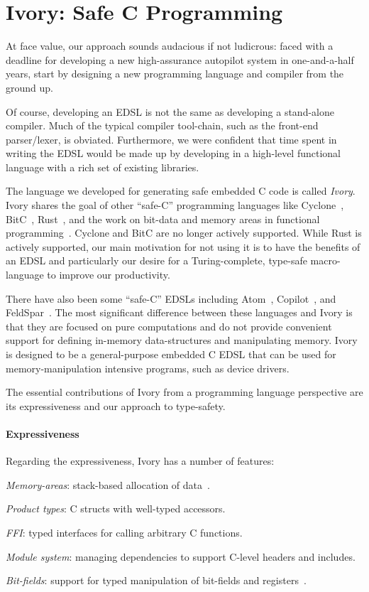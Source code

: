 \section{Ivory: Safe C Programming}
\label{sec:ivory}

At face value, our approach sounds audacious if not ludicrous: faced with a
deadline for developing a new high-assurance autopilot system in one-and-a-half
years, start by designing a new programming language and compiler from the
ground up.

Of course, developing an EDSL is not the same as developing a stand-alone
compiler.  Much of the typical compiler tool-chain, such as the front-end
parser/lexer, is obviated.  Furthermore, we were confident that time spent in
writing the EDSL would be made up by developing in a high-level functional
language with a rich set of existing libraries.

The language we developed for generating safe embedded C code is called
\emph{Ivory}.  Ivory shares the goal of other ``safe-C'' programming languages
like Cyclone~\cite{cyclone}, BitC~\cite{bitc}, Rust~\cite{rust}, and the work on
bit-data and memory areas in functional programming~\cite{high-level,memareas}.
Cyclone and BitC are no longer actively supported.  While Rust is actively
supported, our main motivation for not using it is to have the benefits of an
EDSL and particularly our desire for a Turing-complete, type-safe macro-language
to improve our productivity.

There have also been some ``safe-C'' EDSLs including Atom~\cite{atom},
Copilot~\cite{copilot}, and FeldSpar~\cite{feldspar1}.  The most significant
difference between these languages and Ivory is that they are focused on pure
computations and do not provide convenient support for defining in-memory
data-structures and manipulating memory.  Ivory is designed to be a
general-purpose embedded C EDSL that can be used for memory-manipulation
intensive programs, such as device drivers.

The essential contributions of Ivory from a programming language perspective are
its expressiveness and our approach to type-safety.

\paragraph{Expressiveness}
Regarding the expressiveness, Ivory has a number of features:

\begin{compactitem}
  \item \emph{Memory-areas}: stack-based allocation of data~\cite{memareas}.
  \item \emph{Product types}: C structs with well-typed accessors.
  \item \emph{FFI}: typed interfaces for calling arbitrary C functions.
  \item \emph{Module system}: managing dependencies to support C-level headers
    and includes.
  \item \emph{Bit-fields}: support for typed manipulation of bit-fields and
    registers~\cite{high-level}.
\end{compactitem}

